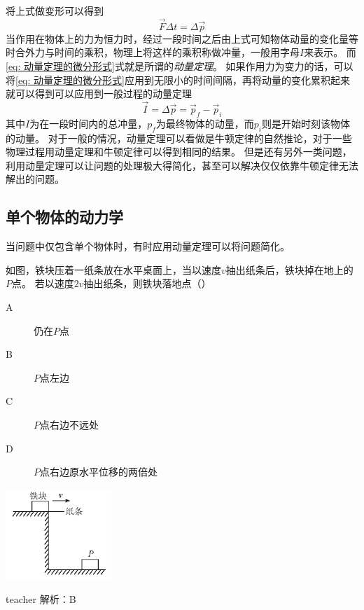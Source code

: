 将上式做变形可以得到
\begin{equation}\label{eq: 动量定理的微分形式}
\vec{F}\Delta t = \Delta \vec{p}
\end{equation}
当作用在物体上的力为恒力时，经过一段时间之后由上式可知物体动量的变化量等时合外力与时间的乘积，物理上将这样的乘积称做冲量，一般用字母$I$来表示。
而\ref{eq: 动量定理的微分形式}式就是所谓的\emph{动量定理}。
如果作用力为变力的话，可以将\ref{eq: 动量定理的微分形式}应用到无限小的时间间隔，再将动量的变化累积起来就可以得到可以应用到一般过程的动量定理
\begin{equation}
\vec{I} =\Delta \vec{p} =  \vec{p}_f - \vec{p}_i
\end{equation}
其中$I$为在一段时间内的总冲量，$p_f$为最终物体的动量，而$p_i$则是开始时刻该物体的动量。
对于一般的情况，动量定理可以看做是牛顿定律的自然推论，对于一些物理过程用动量定理和牛顿定律可以得到相同的结果。
但是还有另外一类问题，利用动量定理可以让问题的处理极大得简化，甚至可以解决仅仅依靠牛顿定律无法解出的问题。

\subsection{单个物体的动力学}
当问题中仅包含单个物体时，有时应用动量定理可以将问题简化。

\begin{example}
如图，铁块压着一纸条放在水平桌面上，当以速度$v$抽出纸条后，铁块掉在地上的$P$点。
若以速度$2v$抽出纸条，则铁块落地点（）
\begin{description}
\item[A] 仍在$P$点
\item[B]$P$点左边
\item[C]$P$点右边不远处
\item[D]$P$点右边原水平位移的两倍处
\end{description}
	\begin{flushright}
		\includegraphics[width = 0.3\textwidth]{images/momentum-1.pdf} 
	\end{flushright}
\begin{taggedblock}{teacher}
\noindent
解析：B

\end{taggedblock}
\end{example}




